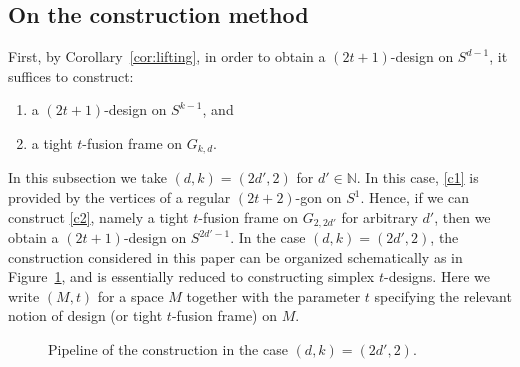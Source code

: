 \documentclass{amsart}
\theoremstyle{definition}
\theoremstyle{remark}
\numberwithin{equation}{section}
\newcommand{\T}{{\mathrm T}}
\newcommand{\N}{{\mathbb N}}
\newcommand{\CP}{\mathbb{CP}}
\begin{document}
\subsection{On the construction method}

First, by Corollary~\ref{cor:lifting}, in order to obtain a $(2t+1)$-design on $S^{d-1}$, it suffices to construct:
\begin{enumerate}
  \item\label{c1} a $(2t+1)$-design on $S^{k-1}$, and
  \item\label{c2} a tight $t$-fusion frame on $G_{k,d}$.
\end{enumerate}

In this subsection we take $(d,k)=(2d',2)$ for $d'\in\N$. In this case, \eqref{c1} is provided by the vertices of a regular $(2t+2)$-gon on $S^1$.
Hence, if we can construct \eqref{c2}, namely a tight $t$-fusion frame on $G_{2,2d'}$ for arbitrary $d'$,
then we obtain a $(2t+1)$-design on $S^{2d'-1}$. In the case $(d,k)=(2d',2)$, the construction considered in this paper can be organized schematically as in Figure~\ref{fig:pipeline},
and is essentially reduced to constructing simplex $t$-designs. Here we write $(M,t)$ for a space $M$ together with the parameter $t$ specifying the relevant notion of design (or tight $t$-fusion frame) on $M$.




\begin{figure}[htbp]
  \centering
  \caption{Pipeline of the construction in the case $(d,k)=(2d',2)$.}
  \label{fig:pipeline}
\end{figure}
\end{document}
